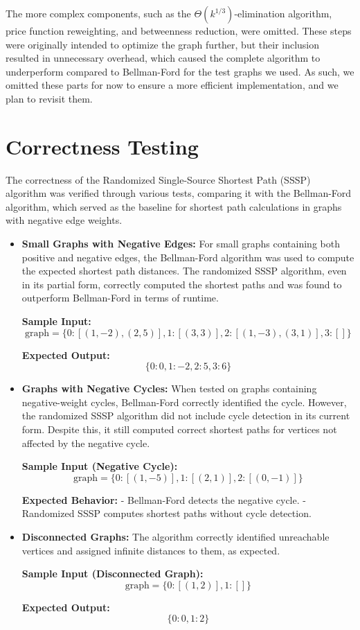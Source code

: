 \documentclass[12pt]{article}
\begin{document}
The more complex components, such as the $\Theta(k^{1/3})$-elimination algorithm, price function reweighting, and betweenness reduction, were omitted. These steps were originally intended to optimize the graph further, but their inclusion resulted in unnecessary overhead, which caused the complete algorithm to underperform compared to Bellman-Ford for the test graphs we used. As such, we omitted these parts for now to ensure a more efficient implementation, and we plan to revisit them.



\section{Correctness Testing}

The correctness of the Randomized Single-Source Shortest Path (SSSP) algorithm was verified through various tests, comparing it with the Bellman-Ford algorithm, which served as the baseline for shortest path calculations in graphs with negative edge weights.

\begin{itemize}
    \item \textbf{Small Graphs with Negative Edges:} 
    For small graphs containing both positive and negative edges, the Bellman-Ford algorithm was used to compute the expected shortest path distances. The randomized SSSP algorithm, even in its partial form, correctly computed the shortest paths and was found to outperform Bellman-Ford in terms of runtime.

    \textbf{Sample Input:}
    \[
    \text{graph} = \{ 0: [(1, -2), (2, 5)], 1: [(3, 3)], 2: [(1, -3), (3, 1)], 3: [] \}
    \]

    \textbf{Expected Output:}
    \[
    \{ 0: 0, 1: -2, 2: 5, 3: 6 \}
    \]

    \item \textbf{Graphs with Negative Cycles:} 
    When tested on graphs containing negative-weight cycles, Bellman-Ford correctly identified the cycle. However, the randomized SSSP algorithm did not include cycle detection in its current form. Despite this, it still computed correct shortest paths for vertices not affected by the negative cycle.

    \textbf{Sample Input (Negative Cycle):}
    \[
    \text{graph} = \{ 0: [(1, -5)], 1: [(2, 1)], 2: [(0, -1)] \}
    \]

    \textbf{Expected Behavior:}
    - Bellman-Ford detects the negative cycle.
    - Randomized SSSP computes shortest paths without cycle detection.

    \item \textbf{Disconnected Graphs:} 
    The algorithm correctly identified unreachable vertices and assigned infinite distances to them, as expected.

    \textbf{Sample Input (Disconnected Graph):}
    \[
    \text{graph} = \{ 0: [(1, 2)], 1: [] \}
    \]

    \textbf{Expected Output:}
    \[
    \{ 0: 0, 1: 2 \}
    \]
\end{itemize}
\end{document}
